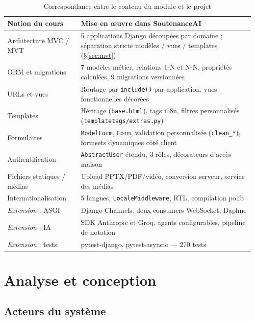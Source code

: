 \documentclass[12pt,a4paper]{report}
\begin{document}
\begin{table}[H]
\centering\small
\begin{tabular}{p{5.2cm}p{9.6cm}}
\toprule
\textbf{Notion du cours} & \textbf{Mise en œuvre dans SoutenanceAI} \\
\midrule
Architecture MVC / MVT & 5 applications Django découpées par domaine ; séparation stricte modèles / vues / templates (§\ref{sec:mvt}) \\
ORM et migrations & 7 modèles métier, relations 1-N et N-N, propriétés calculées, 9 migrations versionnées \\
URLs et vues & Routage par \texttt{include()} par application, vues fonctionnelles décorées \\
Templates & Héritage (\texttt{base.html}), tags i18n, filtres personnalisés (\texttt{templatetags/extras.py}) \\
Formulaires & \texttt{ModelForm}, \texttt{Form}, validation personnalisée (\texttt{clean\_*}), formsets dynamiques côté client \\
Authentification & \texttt{AbstractUser} étendu, 3 rôles, décorateurs d'accès maison \\
Fichiers statiques / médias & Upload PPTX/PDF/vidéo, conversion serveur, service des médias \\
Internationalisation & 5 langues, \texttt{LocaleMiddleware}, RTL, compilation polib \\
\emph{Extension} : ASGI & Django Channels, deux consumers WebSocket, Daphne \\
\emph{Extension} : IA & SDK Anthropic et Groq, agents configurables, pipeline de notation \\
\emph{Extension} : tests & pytest-django, pytest-asyncio --- 270 tests \\
\bottomrule
\end{tabular}
\caption{Correspondance entre le contenu du module et le projet}
\end{table}

\chapter{Analyse et conception}

\section{Acteurs du système}
\end{document}
